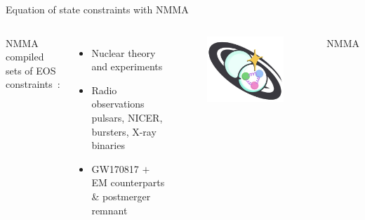 \documentclass[usenames,dvipsnames,t]{beamer}
\begin{document}
\begin{frame}{Equation of state constraints with \textsc{NMMA}}

\def\x{2mm}
\def\y{2mm}
\def\z{-2mm}

\vspace{\z}

\begin{columns}

  \textsc{NMMA} compiled sets of EOS constraints~\cite{Koehn:2024set}:
  \footnotesize
  \begin{itemize}

    \item Nuclear theory and experiments
    \item Radio observations pulsars, NICER, bursters, X-ray binaries
    \item GW170817 $+$ EM counterparts \& postmerger remnant

  \end{itemize}
  \normalsize


  \begin{figure}[t]
    \centering
    \includegraphics[width=\linewidth]{Figures/NMMA logo.jpg}
  \end{figure}

  \vspace{-3mm}
  \small \textsc{NMMA} \normalsize
  
\end{columns}


\end{frame}
\end{document}
